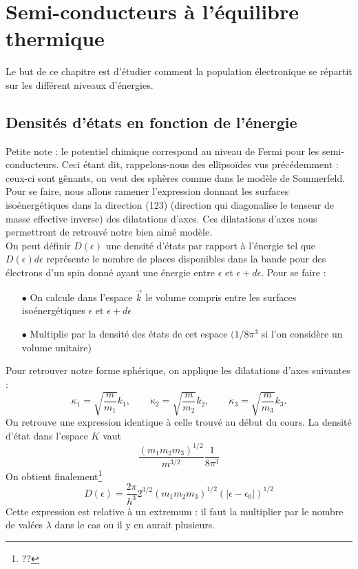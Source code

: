 \chapter{Semi-conducteurs à l'équilibre thermique}
Le but de ce chapitre est d'étudier comment la population électronique se 
répartit sur les différent niveaux d'énergies.

\section{Densités d'états en fonction de l'énergie}
Petite note : le potentiel chimique correspond au niveau de Fermi pour les
semi-conducteurs. Ceci étant dit, rappelons-nous des ellipsoïdes vus 
précédemment : ceux-ci sont gênants, on veut des sphères comme dans le 
modèle de Sommerfeld. Pour se faire, nous allons ramener l'expression 
donnant les surfaces isoénergétiques dans la direction (123) (direction qui 
diagonalise le tenseur de masse effective inverse) des dilatations d'axes. 
Ces dilatations d'axes nous permettront de retrouvé notre bien aimé modèle.\\

On peut définir $D(\epsilon)$ une densité d'états par rapport à l'énergie tel 
que $D(\epsilon)d\epsilon$ représente le nombre de places disponibles dans la bande 
pour des électrons d'un spin donné ayant une énergie entre $\epsilon$ et $\epsilon
+d\epsilon$. Pour se faire : 
\begin{itemize}
\item[$\bullet$] On calcule dans l'espace $\vec{k}$ le volume compris entre les 
surfaces isoénergétiques $\epsilon$ et $\epsilon+d\epsilon$
\item[$\bullet$] Multiplie par la densité des états de cet espace $(1/8\pi^3$ si 
l'on considère un volume unitaire)
\end{itemize}
Pour retrouver notre forme sphérique, on applique les dilatations d'axes suivantes :
\begin{equation}
\kappa_1 = \sqrt{\dfrac{m}{m_1}}k_1,\qquad\kappa_2 = \sqrt{\dfrac{m}{m_2}}k_2,\qquad
\kappa_3 = \sqrt{\dfrac{m}{m_3}}k_3.
\end{equation}
On retrouve une expression identique à celle trouvé au début du cours. La densité 
d'état dans l'espace $K$ vaut 
\begin{equation}
\dfrac{(m_1m_2m_3)^{1/2}}{m^{3/2}}\dfrac{1}{8\pi^3}
\end{equation}
On obtient finalement\footnote{??}
\begin{equation}
D(\epsilon) = \dfrac{2\pi}{h^3}2^{3/2}(m_1m_2m_3)^{1/2}(|\epsilon-\epsilon_0|)^{1/2}
\end{equation}
Cette expression est relative à un extremum : il faut la multiplier par le nombre 
de valées $\lambda$ dans le cas ou il y en aurait plusieurs. \\

